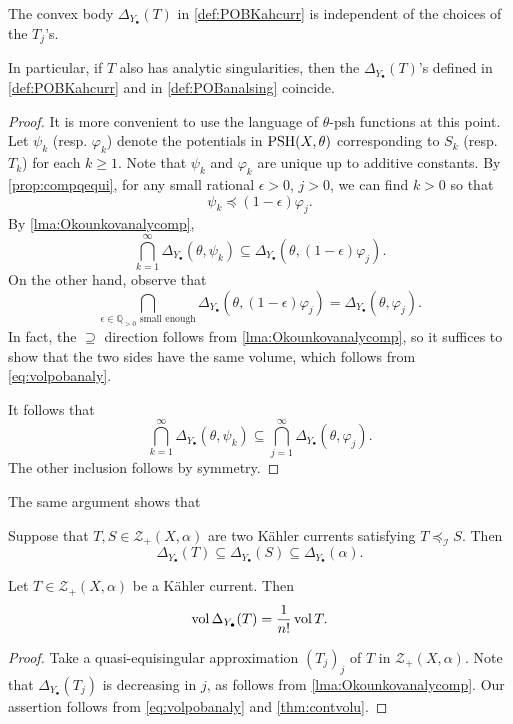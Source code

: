 \begin{lemma}\label{lma:Okounkov:L1517}
    The convex body $\Delta_{Y_{\bullet}}(T)$ in \cref{def:POBKahcurr} is independent of the choices of the $T_j$'s.
\end{lemma}
In particular, if $T$ also has analytic singularities, then the $\Delta_{Y_{\bullet}}(T)$'s defined in \cref{def:POBKahcurr} and in \cref{def:POBanalsing} coincide.
\begin{proof}
    It is more convenient to use the language of $\theta$-psh functions at this point. Let $\psi_k$ (resp. $\varphi_k$) denote the potentials in $\mathrm{PSH}(X,\theta)$ corresponding to $S_k$ (resp. $T_k$) for each $k\geq 1$. Note that $\psi_k$ and $\varphi_k$ are unique up to additive constants. By \cref{prop:compqequi}, for any small rational $\epsilon>0$, $j>0$, we can find $k>0$ so that
    \[
        \psi_k\preceq (1-\epsilon)\varphi_j.
    \]
    By \cref{lma:Okounkovanalycomp},
    \[
    \bigcap_{k=1}^{\infty}\Delta_{Y_{\bullet}}(\theta,\psi_k)\subseteq \Delta_{Y_{\bullet}}(\theta,(1-\epsilon)\varphi_j).
    \]
    On the other hand, observe that
    \[
    \bigcap_{\epsilon\in \mathbb{Q}_{>0}\text{ small enough}}\Delta_{Y_{\bullet}}(\theta,(1-\epsilon)\varphi_j)=\Delta_{Y_{\bullet}}(\theta,\varphi_j).
    \]
    In fact, the $\supseteq$ direction follows from \cref{lma:Okounkovanalycomp}, so it suffices to show that the two sides have the same volume, which follows from \eqref{eq:volpobanaly}.

    It follows that
    \[
    \bigcap_{k=1}^{\infty}\Delta_{Y_{\bullet}}(\theta,\psi_k)\subseteq \bigcap_{j=1}^{\infty}\Delta_{Y_{\bullet}}(\theta,\varphi_j).
    \]
    The other inclusion follows by symmetry.
\end{proof}

The same argument shows that
\begin{corollary}\label{cor:Kahlercurrentcase}
    Suppose that $T,S\in \mathcal{Z}_+(X,\alpha)$ are two Kähler currents satisfying $T \preceq_{\mathcal{I}} S$. Then
    \[
    \Delta_{Y_{\bullet}}(T)\subseteq \Delta_{Y_{\bullet}}(S)\subseteq \Delta_{Y_{\bullet}}(\alpha).
    \]
\end{corollary}

\begin{proposition}\label{prop:Okounkov:L1551}
    Let $T\in \mathcal{Z}_+(X,\alpha)$ be a Kähler current. Then
    \begin{equation}\label{eq:volOkocur}
        \operatorname{vol} \Delta_{Y_{\bullet}}(T)=\frac{1}{n!}\operatorname{vol} T.
    \end{equation}
\end{proposition}
\begin{proof}
Take a quasi-equisingular approximation $(T_j)_j$ of $T$ in $\mathcal{Z}_+(X,\alpha)$. Note that $\Delta_{Y_{\bullet}}(T_j)$ is decreasing in $j$, as follows from \cref{lma:Okounkovanalycomp}. Our assertion follows from \eqref{eq:volpobanaly} and \cref{thm:contvolu}.
\end{proof}



